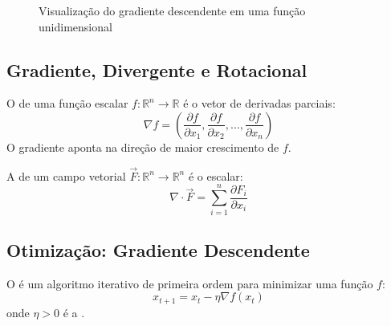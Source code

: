\begin{figure}[htb]
    \centering
    \caption{Visualização do gradiente descendente em uma função
             unidimensional}
    \label{fig:gradiente-descendente}
\end{figure}

\subsection{Gradiente, Divergente e Rotacional}

\begin{definicao}[Gradiente]
    O  de uma função escalar $f: \mathbb{R}^n \to
    \mathbb{R}$ é o vetor de derivadas parciais:
    \[
    \nabla f = \left( \frac{\partial f}{\partial x_1},
    \frac{\partial f}{\partial x_2}, \ldots,
    \frac{\partial f}{\partial x_n} \right)
    \]
    O gradiente aponta na direção de maior crescimento de $f$.
\end{definicao}

\begin{definicao}[Divergente]
    A  de um campo vetorial $\vec{F}: \mathbb{R}^n \to
    \mathbb{R}^n$ é o escalar:
    \[
    \nabla \cdot \vec{F} = \sum_{i=1}^{n} \frac{\partial F_i}{\partial x_i}
    \]
\end{definicao}

\subsection{Otimização: Gradiente Descendente}

\begin{definicao}
    O  é um algoritmo iterativo de primeira
    ordem para minimizar uma função $f$:
    \[
    x_{t+1} = x_t - \eta \nabla f(x_t)
    \]
    onde $\eta > 0$ é a .
\end{definicao}

